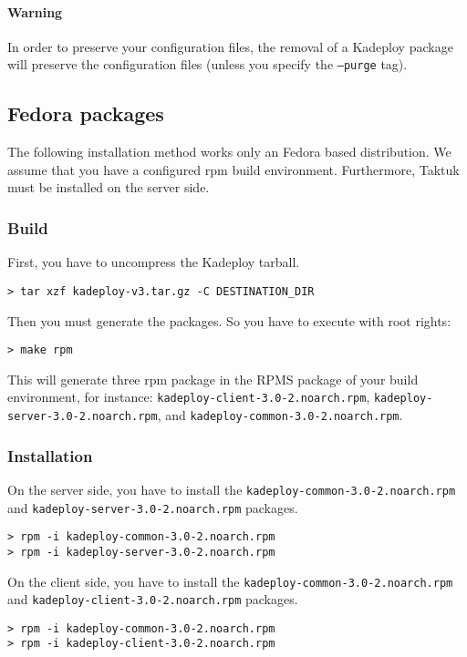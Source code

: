 \documentclass[a4wide,10pt,oneside]{book}
\begin{document}
\paragraph{Warning}
In order to preserve your configuration files, the removal of a Kadeploy package will preserve the configuration files (unless you specify the \texttt{--purge} tag).

\subsection{Fedora packages}
The following installation method works only an Fedora based distribution. We assume that you have a configured rpm build environment. Furthermore, Taktuk must be installed on the server side.
\subsubsection{Build}
\noindent First, you have to uncompress the Kadeploy tarball. 
\begin{small}
\begin{verbatim}
> tar xzf kadeploy-v3.tar.gz -C DESTINATION_DIR
\end{verbatim}
\end{small}

\noindent Then you must generate the packages. So you have to execute with root rights:
\begin{small}
\begin{verbatim}
> make rpm
\end{verbatim}
\end{small}
This will generate three rpm package in the RPMS package of your build environment, for instance: \texttt{kadeploy-client-3.0-2.noarch.rpm}, \texttt{kadeploy-server-3.0-2.noarch.rpm}, and \texttt{kadeploy-common-3.0-2.noarch.rpm}.
\subsubsection{Installation}
\noindent On the server side, you have to install the \texttt{kadeploy-common-3.0-2.noarch.rpm} and \texttt{kadeploy-server-3.0-2.noarch.rpm} packages.
\begin{small}
\begin{verbatim}
> rpm -i kadeploy-common-3.0-2.noarch.rpm
> rpm -i kadeploy-server-3.0-2.noarch.rpm
\end{verbatim}
\end{small}

\noindent On the client side, you have to install the \texttt{kadeploy-common-3.0-2.noarch.rpm} and \texttt{kadeploy-client-3.0-2.noarch.rpm} packages.
\begin{small}
\begin{verbatim}
> rpm -i kadeploy-common-3.0-2.noarch.rpm
> rpm -i kadeploy-client-3.0-2.noarch.rpm
\end{verbatim}
\end{small}
\end{document}
